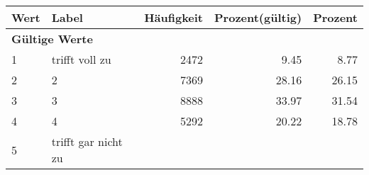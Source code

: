      \begin{longtable}{lXrrr}
     \toprule
     \textbf{Wert} & \textbf{Label} & \textbf{Häufigkeit} & \textbf{Prozent(gültig)} & \textbf{Prozent} \\
     \endhead
     \midrule
     \multicolumn{5}{l}{\textbf{Gültige Werte}}\\

     1 &
     \multicolumn{1}{X}{ trifft voll zu   } &


       \num{2472} &
       \num[round-mode=places,round-precision=2]{9.45} &
         \num[round-mode=places,round-precision=2]{8.77} \\

     2 &
     \multicolumn{1}{X}{ 2   } &


       \num{7369} &
       \num[round-mode=places,round-precision=2]{28.16} &
         \num[round-mode=places,round-precision=2]{26.15} \\

     3 &
     \multicolumn{1}{X}{ 3   } &


       \num{8888} &
       \num[round-mode=places,round-precision=2]{33.97} &
         \num[round-mode=places,round-precision=2]{31.54} \\

     4 &
     \multicolumn{1}{X}{ 4   } &


       \num{5292} &
       \num[round-mode=places,round-precision=2]{20.22} &
         \num[round-mode=places,round-precision=2]{18.78} \\

     5 &
     \multicolumn{1}{X}{ trifft gar nicht zu   } &



\end{longtable}
